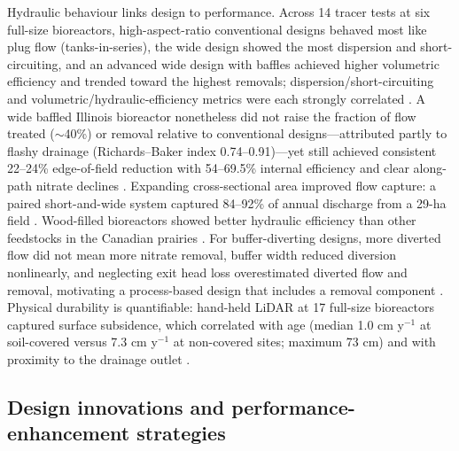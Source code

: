 \documentclass[11pt]{article}
\begin{document}
Hydraulic behaviour links design to performance. Across 14 tracer tests at six full-size bioreactors, high-aspect-ratio conventional designs behaved most like plug flow (tanks-in-series), the wide design showed the most dispersion and short-circuiting, and an advanced wide design with baffles achieved higher volumetric efficiency and trended toward the highest removals; dispersion/short-circuiting and volumetric/hydraulic-efficiency metrics were each strongly correlated \parencite{deOliveira2023}. A wide baffled Illinois bioreactor nonetheless did not raise the fraction of flow treated ($\sim$40\%) or removal relative to conventional designs---attributed partly to flashy drainage (Richards--Baker index 0.74--0.91)---yet still achieved consistent 22--24\% edge-of-field reduction with 54--69.5\% internal efficiency and clear along-path nitrate declines \parencite{Dougherty2020b}. Expanding cross-sectional area improved flow capture: a paired short-and-wide system captured 84--92\% of annual discharge from a 29-ha field \parencite{Maxwell2022}. Wood-filled bioreactors showed better hydraulic efficiency than other feedstocks in the Canadian prairies \parencite{Kohn2023}. For buffer-diverting designs, more diverted flow did not mean more nitrate removal, buffer width reduced diversion nonlinearly, and neglecting exit head loss overestimated diverted flow and removal, motivating a process-based design that includes a removal component \parencite{Abdalaal2023}. Physical durability is quantifiable: hand-held LiDAR at 17 full-size bioreactors captured surface subsidence, which correlated with age (median 1.0 cm y$^{-1}$ at soil-covered versus 7.3 cm y$^{-1}$ at non-covered sites; maximum 73 cm) and with proximity to the drainage outlet \parencite{Christianson2025b}.

\subsection{Design innovations and performance-enhancement strategies}
\end{document}
